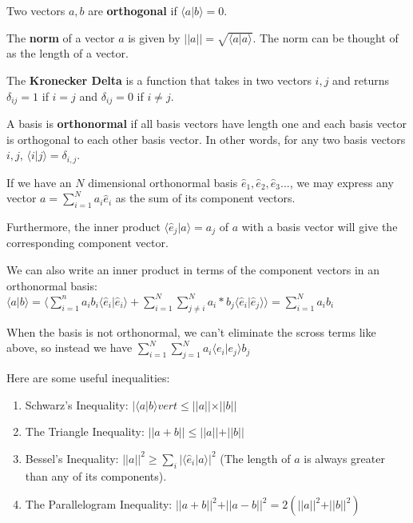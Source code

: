 \documentclass{article}
\begin{document}
\begin{definition}[Orthogonality]
Two vectors $a,b$ are \textbf{orthogonal} if $\langle a \vert b \rangle = 0$. 
\end{definition}

\begin{definition}[Norm]
The \textbf{norm} of a vector $a$ is given by $\vert \vert a \vert \vert = \sqrt{\langle a \vert a \rangle}$. The norm can be thought of as the length of a vector. 
\end{definition}

\begin{definition}
The \textbf{Kronecker Delta} is a function that takes in two vectors $i,j$ and returns $\delta_{ij} = 1$ if $i=j$ and $\delta_{ij} = 0$ if $i \neq j$.
\end{definition}
\begin{definition}
A basis is \textbf{orthonormal} if all basis vectors have length one and each basis vector is orthogonal to each other basis vector. In other words, for any two basis vectors $i,j$, $\langle i \vert j \rangle = \delta_{i,j}$.
\end{definition}

If we have an $N$ dimensional orthonormal basis $\hat{e}_1, \hat{e}_2,\hat{e}_3 ...$, we may express any vector $a = \sum_{i=1}^{N} a_i \hat{e}_i$ as the sum of its component vectors. 

Furthermore, the inner product $\langle \hat{e}_j \vert a \rangle = a_j$ of $a$ with a basis vector will give the corresponding component vector.

We can also write an inner product in terms of the component vectors in an orthonormal basis: $\langle a \vert b \rangle = \langle \sum_{i=1}^{n} a_ib_i \langle \hat{e}_i \vert \hat{e}_i \rangle + \sum_{i=1}^{N}\sum_{j\neq i}^{N} a_i*b_j \langle \hat{e}_i \vert \hat{e}_j \rangle\rangle = \sum_{i=1}^{N} a_ib_i$

When the basis is not orthonormal, we can't eliminate the scross terms like above, so instead we have $\sum_{i=1}^{N}\sum_{j=1}^{N} a_i\langle e_i \vert e_j \rangle b_j$

\begin{proposition}[Inequalities]
    Here are some useful inequalities:
\begin{enumerate}
    \item Schwarz's Inequality: $\vert \langle a\vert b\rangle
    vert \leq \vert \vert a \vert \vert\times \vert \vert b\vert  \vert$
    \item The Triangle Inequality: $\vert\vert a + b\vert\vert\leq \vert\vert a\vert\vert + \vert\vert b\vert\vert$
    \item Bessel's Inequality: $\vert\vert a \vert\vert^2 \geq \sum_{i}\vert \langle \hat{e}_i\vert a \rangle \vert^2$ (The length of $a$ is always greater than any of its components).
    \item The Parallelogram Inequality: $\vert \vert a+b\vert\vert^2 + \vert \vert a-b\vert\vert^2 = 2(\vert\vert a\vert\vert^2 + \vert\vert b\vert\vert^2)$
\end{enumerate}
\end{proposition}
\end{document}
